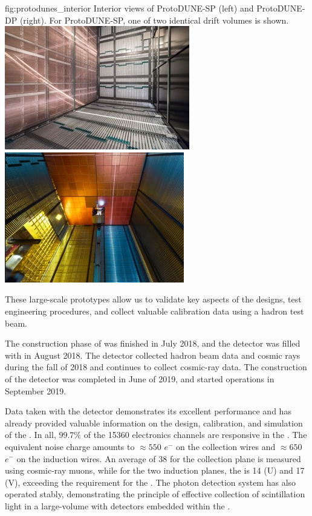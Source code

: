 \begin{dunefigure}
{fig:protodunes_interior}
{Interior views of ProtoDUNE-SP (left) and ProtoDUNE-DP (right). For ProtoDUNE-SP, one of two identical drift volumes is shown.}
\includegraphics[width=0.46\linewidth]{graphics/ProtoDUNE-sp-interior.jpg}\hspace{0.05\linewidth}
\includegraphics[width=0.44\linewidth]{graphics/protodune-dp-interior.jpg}
\end{dunefigure}

These large-scale prototypes allow us to validate key aspects of 
the  designs, test engineering procedures, and collect 
valuable calibration data using a hadron test beam. 

The construction phase of  was finished in July 2018, 
and the detector was filled with  in August 2018. The 
detector collected hadron beam data and cosmic rays during the 
fall of 2018 and continues to collect cosmic-ray data.
The construction of the  detector was completed in 
June of 2019, and started operations in September 2019.  

Data taken with the  detector demonstrates its 
excellent performance and has already provided valuable 
information on the design, calibration, and simulation of the 
 . In all, $99.7\%$ of the 15360  
electronics channels are responsive in the . The 
equivalent noise charge
amounts to $\approx 550$ $e^{-}$ on the collection 
wires and $\approx 650$ $e^{-}$ on the induction wires. An average 
 of 38 for the collection plane is measured using 
cosmic-ray muons, while for the two induction planes, the 
 is 14 (U) and 17 (V), exceeding the requirement  
for the  . 
The  photon detection system has also operated stably, 
demonstrating the principle of effective collection of 
scintillation light in a large-volume  with 
detectors embedded within the .


